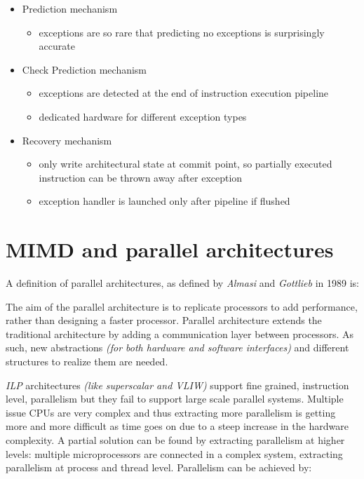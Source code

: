 \documentclass[english]{article}
\begin{document}
\begin{itemize}
  \item Prediction mechanism
        \begin{itemize}[label=\(\rightarrow\)]
          \item exceptions are so rare that predicting no exceptions is surprisingly accurate
        \end{itemize}
  \item Check Prediction mechanism
        \begin{itemize}[label=\(\rightarrow\)]
          \item exceptions are detected at the end of instruction execution pipeline
          \item dedicated hardware for different exception types
        \end{itemize}
  \item Recovery mechanism
        \begin{itemize}[label=\(\rightarrow\)]
          \item only write architectural state at commit point, so partially executed instruction can be thrown away after exception
          \item exception handler is launched only after pipeline if flushed
        \end{itemize}
\end{itemize}

\clearpage

\section{MIMD and parallel architectures}
\label{sec:mimd}

A definition of parallel architectures, as defined by \textit{Almasi} and \textit{Gottlieb} in 1989 is:


The aim of the parallel architecture is to replicate processors to add performance, rather than designing a faster processor.
Parallel architecture extends the traditional architecture by adding a communication layer between processors.
As such, new abstractions \textit{(for both hardware and software interfaces)} and different structures to realize them are needed.

\bigskip
\textit{ILP} architectures \textit{(like superscalar and VLIW)} support fine grained, instruction level, parallelism but they fail to support large scale parallel systems.
Multiple issue CPUs are very complex and thus extracting more parallelism is getting more and more difficult as time goes on due to a steep increase in the hardware complexity.
A partial solution can be found by extracting parallelism at higher levels: multiple microprocessors are connected in a complex system, extracting parallelism at process and thread level.
Parallelism can be achieved by:
\end{document}
